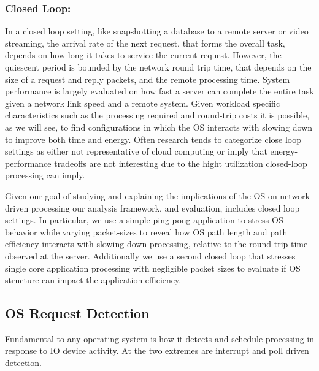 \subsubsection{Closed Loop:}
In a closed loop setting, like snapshotting a database to a remote server or video streaming, the arrival rate of the next request, that forms the overall task, depends on how long it takes to service the current request.  However, the quiescent period is bounded by the network round trip time, that depends on  the size of a request and reply packets, and the remote processing time.   System performance is largely evaluated on how fast a server can complete the entire task given a network link speed and a remote system.  Given workload specific characteristics such as the processing required and round-trip costs it is possible, as we will see, to find configurations in which the OS interacts with slowing down to improve both time and energy.   Often research tends to categorize close loop settings as either not representative of cloud computing or imply that energy-performance tradeoffs are not interesting due to the hight utilization closed-loop processing can imply.  

Given our goal of studying and explaining the implications of the OS on network driven processing our analysis framework, and evaluation, includes closed loop settings.  In particular, we use a simple ping-pong application to stress OS behavior while varying packet-sizes to reveal how OS path length and path efficiency interacts with slowing down processing, relative to the round trip time observed at the server.  Additionally we use a second closed loop that stresses single core application processing with negligible packet sizes to evaluate if OS structure can impact the application efficiency.  

 
\subsection{OS Request Detection}

Fundamental to any operating system is how it detects and schedule processing in response to IO device activity.  At the two extremes are interrupt and poll driven detection.  

